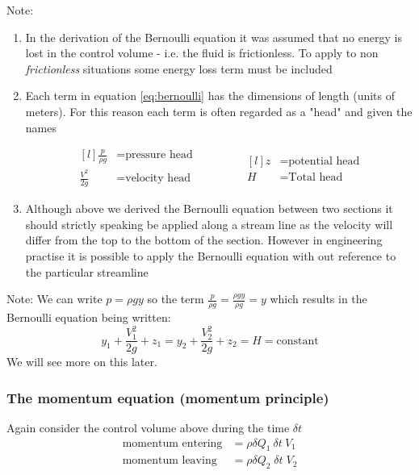 \documentclass[a4paper, 12pt, british]{article} %
\numberwithin{equation}{section}
\numberwithin{figure}{section}
\numberwithin{table}{section}
\begin{document}
Note:
\begin{enumerate}
	\item In the derivation of the Bernoulli equation it was assumed that no energy is lost in the control volume - i.e. the fluid is frictionless. To apply to non \textit{frictionless} situations some energy  loss term must be included

\item Each term in equation \ref{eq:bernoulli} has the dimensions of length (units of meters). For this reason each term is often regarded as a "head" and given the names


 \begin{equation*}
 \begin{aligned}[l]
 \frac{p}{\rho g}   &= \text{pressure head} \\
\frac{V^2}{2g} &= \text{velocity head}
 \end{aligned}
 \qquad\qquad
  \begin{aligned}[l]
 z  &= \text{potential head} \\
H  &= \text{Total head}
 \end{aligned}
 \end{equation*}
\item Although above we derived the Bernoulli equation between two sections it should strictly speaking be applied along a stream line as the velocity will differ from the top to the bottom of the section. However in engineering practise it is possible to apply the Bernoulli equation with out reference to the particular streamline
\end{enumerate}
Note: We can write $p = \rho g y$ so the term 
$\frac{p}{\rho g}=\frac{\rho g y}{\rho g} = y$ which results in the Bernoulli equation being written: 
\begin{equation*}
y_1  + \frac{V_1^2}{2g} + z_1  = y_2  + \frac{V_2^2}{2g} + z_2 = H = \text{constant}
\label{eq:bernoulli_y}
\end{equation*}
We will see more on this later.

\subsubsection{The momentum equation (momentum principle)}

Again consider the control volume above during the time $\delta t$
 \begin{align*}
\text{momentum entering} &= \rho \delta Q_1 \: \delta t\: V_1 \\
\text{momentum leaving} &= \rho \delta Q_2 \; \delta t\; V_2
\label{eq:momentum_principal}
\end{align*}
 
\end{document}
